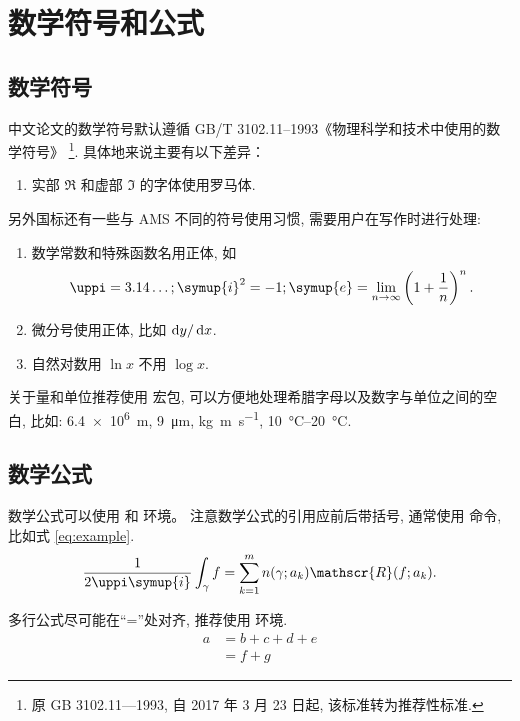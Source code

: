 
\chapter{数学符号和公式}

\section{数学符号}

中文论文的数学符号默认遵循 GB/T 3102.11--1993《物理科学和技术中使用的数学符号》
\footnote{原 GB 3102.11—1993, 自 2017 年 3 月 23 日起, 该标准转为推荐性标准.}.
具体地来说主要有以下差异：
\begin{enumerate}
  \item 实部 $\Re$ 和虚部 $\Im$ 的字体使用罗马体.
\end{enumerate}

另外国标还有一些与 AMS 不同的符号使用习惯, 需要用户在写作时进行处理:
\begin{enumerate}
  \item 数学常数和特殊函数名用正体, 如
    \begin{equation*}
      \uppi = 3.14\dots; \quad
      \symup{i}^2 = -1; \quad
      \symup{e} = \lim_{n \to \infty} \left( 1 + \frac{1}{n} \right)^n.
    \end{equation*}
  \item 微分号使用正体, 比如 $\mathop{}\!\mathrm{d} y / \mathop{}\!\mathrm{d} x$.
  \item 自然对数用 $\ln x$ 不用 $\log x$.
\end{enumerate}

关于量和单位推荐使用  宏包, 可以方便地处理希腊字母以及数字与单位之间的空白, 比如:
\SI{6.4e6}{m}, \SI{9}{\micro\meter}, \si{kg.m.s^{-1}}, \SIrange{10}{20}{\degreeCelsius}.


\section{数学公式}

数学公式可以使用  和  环境。
注意数学公式的引用应前后带括号, 通常使用  命令, 比如式 \eqref{eq:example}.
\begin{equation}
  \frac{1}{2 \uppi \symup{i}} \int_\gamma f = \sum_{k=1}^m n(\gamma; a_k) \mathscr{R}(f; a_k).
  \label{eq:example}
\end{equation}

多行公式尽可能在“=”处对齐, 推荐使用  环境.
\begin{align}
  a & = b + c + d + e \\
    & = f + g
\end{align}


